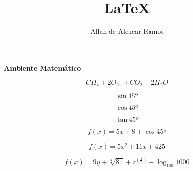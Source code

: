 \documentclass[12pt, a4paper]{article}
\begin{document}
\title{LaTeX}
\author{Allan de Alencar Ramos}
\maketitle

\begin{center}
\large\textbf{Ambiente Matemático}
\end{center}
\vspace{0.5cm}

\begin{equation}
CH_{4} + 2 O_{2} \rightarrow CO_{2} + 2 H_{2}O
\end{equation}

\begin{equation}
\sin 45º
\end{equation}

\begin{equation}
\cos 45º
\end{equation}

\begin{equation}
\tan 45º
\end{equation}

\begin{equation}
f(x) = 5x + 8 + \cos 45º
\end{equation}

\begin{equation}
f(x) = 5x^{2} + 11x + 425
\end{equation}

\begin{equation}
f(x) = 9y + \sqrt[3]{81} + z^{( \frac{4}{2} )} + \log_100 1000 
\end{equation}
\end{document}
